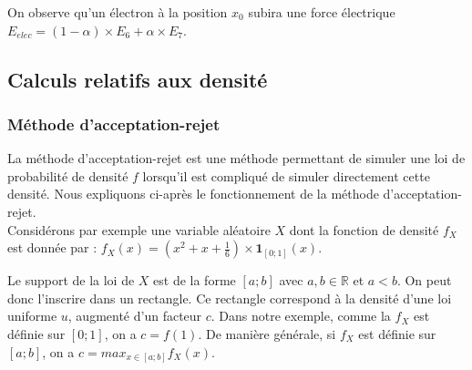 \documentclass{article}
\begin{document}
On observe qu'un électron à la position $x_0$ subira une force électrique $E_{elec} = (1 - \alpha) \times E_6 + \alpha \times E_7$.
\subsection{Calculs relatifs aux densité}
\subsubsection{Méthode d'acceptation-rejet}
\label{sssec:a}
La méthode d'acceptation-rejet est une méthode permettant de simuler une loi de probabilité de densité $f$ lorsqu'il est compliqué de simuler directement cette densité. Nous expliquons ci-après le fonctionnement de la méthode d'acceptation-rejet.\\
Considérons par exemple une variable aléatoire $X$ dont la fonction de densité $f_X$ est donnée par : $f_X(x) = (x^2 + x + \frac{1}{6}) \times \mathbf{1}_{[0;1]}(x)$.
\begin{center}
\end{center}
Le support de la loi de $X$ est de la forme $[a;b]$ avec $a,b \in \mathbb{R}$ et $a < b$. On peut donc l'inscrire dans un rectangle. Ce rectangle correspond à la densité d'une loi uniforme $u$, augmenté d'un facteur $c$. Dans notre exemple, comme la $f_X$ est définie sur $[0;1]$, on a $c = f(1)$. De manière générale, si $f_X$ est définie sur $[a;b]$, on a $c = max_{x \in [a;b]} f_X(x)$.
\begin{center}
\end{center}
\end{document}
